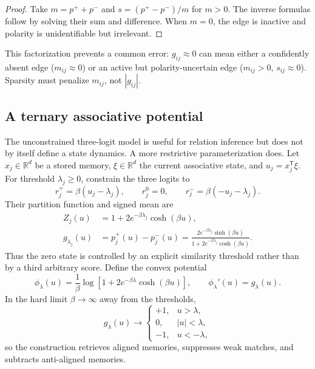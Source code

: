 \documentclass[10pt,twocolumn]{article}
\newcommand{\R}{\mathbb R}
\newcommand{\1}{\mathbf 1}
\theoremstyle{remark}
\begin{document}
\begin{proof}
Take $m=p^++p^-$ and $s=(p^+-p^-)/m$ for $m>0$.  The inverse formulas follow by solving their sum
and difference.  When $m=0$, the edge is inactive and polarity is unidentifiable but irrelevant.
\end{proof}

This factorization prevents a common error: $g_{ij}\approx0$ can mean either a confidently absent
edge ($m_{ij}\approx0$) or an active but polarity-uncertain edge
($m_{ij}>0$, $s_{ij}\approx0$).  Sparsity must penalize $m_{ij}$, not $|g_{ij}|$.

\subsection{A ternary associative potential}

The unconstrained three-logit model is useful for relation inference but does not by itself define
a state dynamics.  A more restrictive parameterization does.  Let $x_j\in\R^d$ be a stored
memory, $\xi\in\R^d$ the current associative state, and $u_j=x_j^{\mathsf T}\xi$.  For threshold
$\lambda_j\geq0$, constrain the three logits to
\begin{equation}
r_j^+=\beta(u_j-\lambda_j),\qquad
r_j^0=0,\qquad
r_j^-=\beta(-u_j-\lambda_j).
\label{eq:associative-ternary-logits}
\end{equation}
Their partition function and signed mean are
\begin{align}
Z_j(u)&=1+2e^{-\beta\lambda_j}\cosh(\beta u),\nonumber\\
g_{\lambda_j}(u)&=p_j^+(u)-p_j^-(u)
=\frac{2e^{-\beta\lambda_j}\sinh(\beta u)}
{1+2e^{-\beta\lambda_j}\cosh(\beta u)}.
\label{eq:ternary-associative-gate}
\end{align}
Thus the zero state is controlled by an explicit similarity threshold rather than by a third
arbitrary score.  Define the convex potential
\begin{equation}
\phi_{\lambda}(u)=\frac{1}{\beta}
\log\!\left[1+2e^{-\beta\lambda}\cosh(\beta u)\right],
\qquad \phi_{\lambda}'(u)=g_{\lambda}(u).
\label{eq:ternary-associative-potential}
\end{equation}
In the hard limit $\beta\to\infty$ away from the thresholds,
\begin{equation}
g_{\lambda}(u)\longrightarrow
\begin{cases}
+1,&u>\lambda,\\
0,&|u|<\lambda,\\
-1,&u<-\lambda,
\end{cases}
\label{eq:ternary-hard-threshold}
\end{equation}
so the construction retrieves aligned memories, suppresses weak matches, and subtracts
anti-aligned memories.
\end{document}
